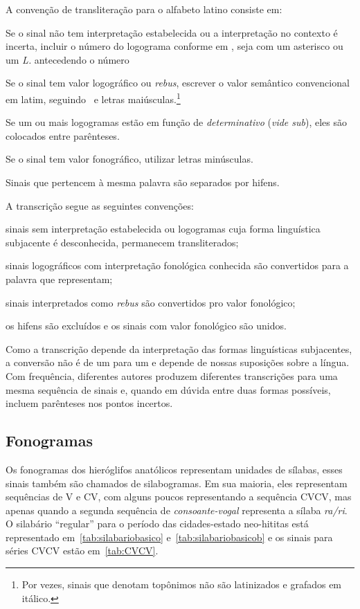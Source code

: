 \noindent A convenção de transliteração para o alfabeto latino consiste em:
\noprelistbreak%
\begin{compactenum}
	\item Se o sinal não tem interpretação estabelecida ou a interpretação no
	contexto é incerta, incluir o número do logograma conforme em
	\citet{LarocheHH}, seja com um asterisco ou um \emph{L.} antecedendo o
	número
	\item Se o sinal tem valor logográfico ou \emph{rebus},
	escrever o valor semântico convencional em latim,
	seguindo~\citet{LarocheHH} e letras maiúsculas.\footnote{Por vezes,
		sinais que denotam topônimos não são latinizados e grafados em itálico.}
	\item Se um ou mais logogramas estão em função de \emph{determinativo}
	(\emph{vide sub}), eles são colocados entre parênteses.
	\item Se o sinal tem valor fonográfico, utilizar letras minúsculas.
	\item Sinais que pertencem à mesma palavra são separados por hifens.
\end{compactenum}
A transcrição segue as seguintes convenções:
\begin{compactenum}
	\item sinais sem interpretação estabelecida ou logogramas cuja forma linguística
	subjacente é desconhecida, permanecem transliterados;
	\item sinais logográficos com interpretação fonológica conhecida são convertidos para a
	palavra que representam;
	\item sinais interpretados como \emph{rebus} são convertidos pro valor
	fonológico;
	\item os hifens são excluídos e os sinais com valor fonológico são unidos.
\end{compactenum}
Como a transcrição depende da interpretação das formas linguísticas subjacentes,
a conversão não é de um para um e depende de nossas suposições sobre a língua.
Com frequência, diferentes autores produzem diferentes transcrições para uma mesma
sequência de sinais e, quando em dúvida entre duas formas possíveis, incluem
parênteses nos pontos incertos.

\subsection{Fonogramas}

Os fonogramas dos hieróglifos anatólicos representam unidades de sílabas,
esses sinais também são chamados de silabogramas.
Em sua maioria, eles representam sequências de V e CV,
com alguns poucos representando a sequência CVCV, mas apenas quando a segunda
sequência de \emph{consoante\hyp{}vogal} representa a sílaba \emph{ra\slash{}ri}.\@
O silabário ``regular'' para o período das cidades-estado neo-hititas está
representado em~\autoref{tab:silabariobasico} e~\autoref{tab:silabariobasicob} e
os sinais para séries CVCV estão em~\autoref{tab:CVCV}.

